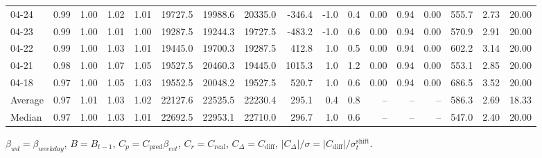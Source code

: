 \begin{threeparttable}
{\begin{tabular}{lrrrrrrrrrrrrrrrr}
  04-24 &         0.99 &           1.00 &          1.02 &          1.01 & 19727.5 & 19988.6 & 20335.0 &     -346.4 &                     -1.0 &                 0.4 &       0.00 &      0.94 &           0.00 &            555.7 &            2.73 &                  20.00 \\
  04-23 &         0.99 &           1.00 &          1.01 &          1.00 & 19287.5 & 19244.3 & 19727.5 &     -483.2 &                     -1.0 &                 0.6 &       0.00 &      0.94 &           0.00 &            570.9 &            2.91 &                  20.00 \\
  04-22 &         0.99 &           1.00 &          1.03 &          1.01 & 19445.0 & 19700.3 & 19287.5 &      412.8 &                      1.0 &                 0.5 &       0.00 &      0.94 &           0.00 &            602.2 &            3.14 &                  20.00 \\
  04-21 &         0.98 &           1.00 &          1.07 &          1.05 & 19527.5 & 20460.3 & 19445.0 &     1015.3 &                      1.0 &                 1.2 &       0.00 &      0.94 &           0.00 &            553.1 &            2.85 &                  20.00 \\
  04-18 &         0.97 &           1.00 &          1.05 &          1.03 & 19552.5 & 20048.2 & 19527.5 &      520.7 &                      1.0 &                 0.6 &       0.00 &      0.94 &           0.00 &            686.5 &            3.52 &                  20.00 \\
Average &         0.97 &           1.01 &          1.03 &          1.02 & 22127.6 & 22525.5 & 22230.4 &      295.1 &                      0.4 &                 0.8 &         -- &        -- &             -- &            586.3 &            2.69 &                  18.33 \\
 Median &         0.97 &           1.00 &          1.03 &          1.01 & 22692.5 & 22953.1 & 22710.0 &      296.7 &                      1.0 &                 0.6 &         -- &        -- &             -- &            547.0 &            2.40 &                  20.00 \\
\bottomrule
\end{tabular}
}
\begin{tablenotes}\footnotesize
\item $\beta_{wd}=\beta_{weekday}$, $B=B_{t-1}$,
$C_p=C_{\text{pred}}\beta_{evt}$, $C_r=C_{\text{real}}$,
$C_\Delta=C_{\text{diff}}$, $|C_\Delta|/\sigma=|C_{\text{diff}}|/\sigma_t^{\text{shift}}$.
\end{tablenotes}
\end{threeparttable}
\endgroup
